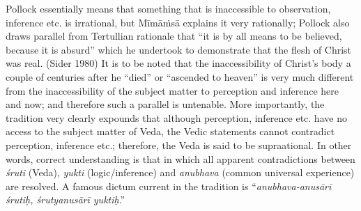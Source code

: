 Pollock essentially means that something that is inaccessible to observation, inference etc. is irrational, but {Mīmāṁsā} explains it very rationally; Pollock also draws parallel from Tertullian rationale that “it is by all means to be believed, because it is absurd” which he undertook to demonstrate that the flesh of Christ was real. (Sider 1980) It is to be noted that the inaccessibility of Christ’s body a couple of centuries after he “died” or “ascended to heaven” is very much different from the inaccessibility of the subject matter to perception and inference here and now; and therefore such a parallel is untenable. More importantly, the tradition very clearly expounds that although perception, inference etc. have no access to the subject matter of Veda, the Vedic statements cannot contradict perception, inference etc.; therefore, the Veda is said to be supraational. In other words, correct understanding is that in which all apparent contradictions between \textit{śruti} (Veda), \textit{yukti }(logic/inference) and \textit{anubhava} (common universal experience) are resolved. A famous dictum current in the tradition is “\textit{anubhava-anusārī śrutiḥ, śrutyanusārī yuktiḥ}.”

